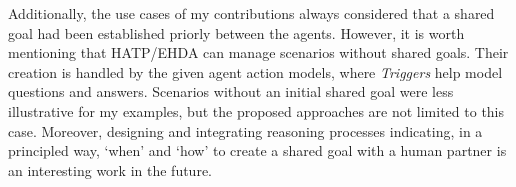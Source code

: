 Additionally, the use cases of my contributions always considered that a shared goal had been established priorly between the agents. However, it is worth mentioning that HATP/EHDA can manage scenarios without shared goals. Their creation is handled by the given agent action models, where \textit{Triggers} help model questions and answers. Scenarios without an initial shared goal were less illustrative for my examples, but the proposed approaches are not limited to this case. Moreover, designing and integrating reasoning processes indicating, in a principled way, `when' and `how' to create a shared goal with a human partner is an interesting work in the future.
